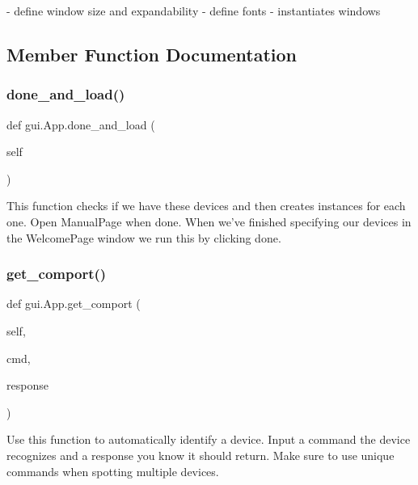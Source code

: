 \begin{DoxyVerb}- define window size and expandability
- define fonts
- instantiates windows
\end{DoxyVerb}
 

\subsection{Member Function Documentation}
\mbox{\label{classgui_1_1_app_adef694d0873e20b93827bb690e8c8925}} 
\subsubsection{\texorpdfstring{done\_and\_load()}{done\_and\_load()}}
{\footnotesize\ttfamily def gui.\+App.\+done\+\_\+and\+\_\+load (\begin{DoxyParamCaption}\item[{}]{self }\end{DoxyParamCaption})}

\begin{DoxyVerb}This function checks if we have these devices and then creates instances for each one. Open ManualPage when done.
When we've finished specifying our devices in the WelcomePage window we run this by clicking done.
\end{DoxyVerb}
 \mbox{\label{classgui_1_1_app_ab2635deb65f781dfe23d2fde7c3c93c8}} 
\subsubsection{\texorpdfstring{get\_comport()}{get\_comport()}}
{\footnotesize\ttfamily def gui.\+App.\+get\+\_\+comport (\begin{DoxyParamCaption}\item[{}]{self,  }\item[{}]{cmd,  }\item[{}]{response }\end{DoxyParamCaption})}

\begin{DoxyVerb}Use this function to automatically identify
a device. Input a command the device recognizes and a response you know
it should return. Make sure to use unique commands when spotting multiple devices.
\end{DoxyVerb}
 \mbox{\label{classgui_1_1_app_a1b5ba9c55ba86ed27afc50032e5fb41f}} 
